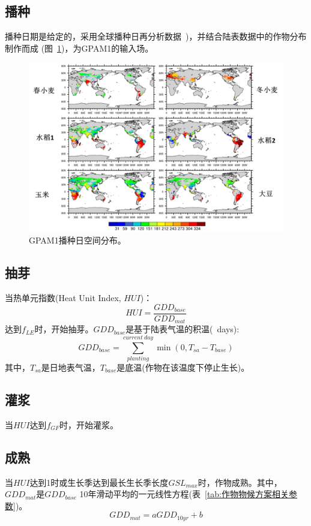 \subsection{播种}\label{sec:播种}
  播种日期是给定的，采用全球播种日再分析数据~\citep{jagermeyr2021climate})，并结合陆表数据中的作物分布制作而成 (图~\ref{fig:GPAM1播种日空间分布})，为GPAM1的输入场。

{
\begin{figure}[htbp]
\centering
\includegraphics[scale=1.2]{Figures/作物模式/GPAM1播种日空间分布.png}
\caption{GPAM1播种日空间分布。}
\label{fig:GPAM1播种日空间分布}
\end{figure}
}

\subsection{抽芽}
  当热单元指数(Heat Unit Index, $HUI$)：
  \begin{equation}\label{HUI}
  HUI=\frac{GDD_{base}}{GDD_{mat}}
  \end{equation}
  达到$f_{LE}$时，开始抽芽。$GDD_{base}$是基于陆表气温的积温(\textcelsius\ days):
  \begin{equation}
  GDD_{ {base }}=\sum_{planting}^{current\ day} \min \left(0, T_{sa}-T_{base}\right)
  \end{equation}
 其中，$T_{sa}$是日地表气温，$T_{base}$是底温(作物在该温度下停止生长)。
  
\subsection{灌浆}
  当$HUI$达到$f_{GF}$时，开始灌浆。

\subsection{成熟}
  当$HUI$达到1时或生长季达到最长生长季长度$GSL_{max}$时，作物成熟。其中，$GDD_{mat}$是$GDD_{base}$ 
  10年滑动平均的一元线性方程(表~\ref{tab:作物物候方案相关参数})。
  \begin{equation}
    GDD_{mat}=a GDD_{10yr}+b
  \end{equation}
  
